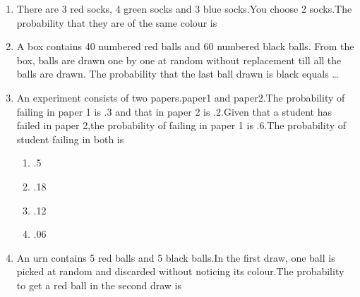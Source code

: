 \renewcommand{\theequation}{\theenumi}
\renewcommand{\thefigure}{\theenumi}
\renewcommand{\thetable}{\theenumi}
\begin{enumerate}[label=\thesection.\arabic*.,ref=\thesection.\theenumi]

\item There are 3 red socks, 4 green socks and 3 blue socks.You choose 2 socks.The probability that they are of the same colour is

\begin{enumerate}
\end{enumerate}
\solution

%
\item A box contains 40 numbered red balls and 60 numbered black balls. From the box, balls are drawn one by one at random without replacement till all the balls are drawn. The probability that the last ball drawn is black equals \dots


\item An experiment consists of two papers.paper1 and paper2.The probability of failing in paper 1 is .3 and that in paper 2 is .2.Given that a student has failed in paper 2,the probability of failing in paper 1 is .6.The probability of student failing in both is\\
\begin{enumerate}
    \setlength\itemsep{2em}
\item .5 
\item .18 
\item .12 
\item .06 
\end{enumerate}
%
\solution

%
\item An urn contains 5 red balls and 5 black balls.In the first draw, one ball is picked at random and discarded without noticing its colour.The probability to get a red ball in the second draw is 
\begin{enumerate}
    \end{enumerate}    
%
\solution

%



\end{enumerate}
